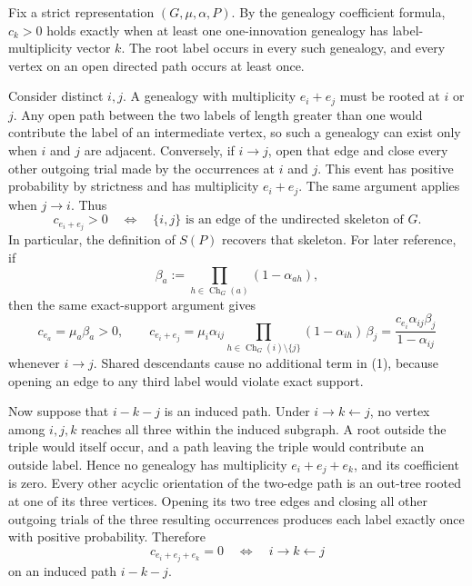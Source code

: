 Fix a strict representation \((G,\mu,\alpha,P)\).  By the genealogy coefficient formula, \(c_k>0\) holds exactly when at least one one-innovation genealogy has label-multiplicity vector \(k\).  The root label occurs in every such genealogy, and every vertex on an open directed path occurs at least once.

Consider distinct \(i,j\).  A genealogy with multiplicity \(e_i+e_j\) must be rooted at \(i\) or \(j\).  Any open path between the two labels of length greater than one would contribute the label of an intermediate vertex, so such a genealogy can exist only when \(i\) and \(j\) are adjacent.  Conversely, if \(i\to j\), open that edge and close every other outgoing trial made by the occurrences at \(i\) and \(j\).  This event has positive probability by strictness and has multiplicity \(e_i+e_j\).  The same argument applies when \(j\to i\).  Thus
\[
 c_{e_i+e_j}>0\quad\Longleftrightarrow\quad
 \{i,j\}\text{ is an edge of the undirected skeleton of }G.
\]
In particular, the definition of \(S(P)\) recovers that skeleton.  For later reference, if
\[
 \beta_a:=\prod_{h\in\operatorname{Ch}_G(a)}(1-\alpha_{ah}),
\]
then the same exact-support argument gives
\[
 c_{e_a}=\mu_a\beta_a>0,
 \qquad
 c_{e_i+e_j}
 =\mu_i\alpha_{ij}
   \prod_{h\in\operatorname{Ch}_G(i)\setminus\{j\}}(1-\alpha_{ih})\,\beta_j
 =\frac{c_{e_i}\alpha_{ij}\beta_j}{1-\alpha_{ij}}
\tag{1}
\]
whenever \(i\to j\).  Shared descendants cause no additional term in (1), because opening an edge to any third label would violate exact support.

Now suppose that \(i-k-j\) is an induced path.  Under \(i\to k\leftarrow j\), no vertex among \(i,j,k\) reaches all three within the induced subgraph.  A root outside the triple would itself occur, and a path leaving the triple would contribute an outside label.  Hence no genealogy has multiplicity \(e_i+e_j+e_k\), and its coefficient is zero.  Every other acyclic orientation of the two-edge path is an out-tree rooted at one of its three vertices.  Opening its two tree edges and closing all other outgoing trials of the three resulting occurrences produces each label exactly once with positive probability.  Therefore
\[
 c_{e_i+e_j+e_k}=0
 \quad\Longleftrightarrow\quad i\to k\leftarrow j
\tag{2}
\]
on an induced path \(i-k-j\).

